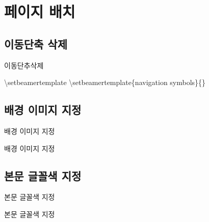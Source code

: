 \documentclass[ aspectratio=169,  10pt,blue,xcolor=pdftex,dvipsnames,table,handout,notes]{beamer}
\begin{document}
		\section{페이지 배치}

		\subsection{이동단축 삭제}
		\begin{frame}{이동단추삭제}

			\begin{block} {\textbackslash setbeamertemplate}
			\textbackslash setbeamertemplate\{navigation symbols\}\{\}
			\end{block}
		\end{frame}


		\subsection{배경 이미지 지정}
		\begin{frame}[shrink=0]{배경 이미지 지정}

			\begin{block} {배경 이미지 지정}
			\end{block}
		\end{frame}


		\subsection{본문 글꼴색 지정}
		\begin{frame}[shrink=0]{본문 글꼴색 지정}

			\begin{block} {본문 글꼴색 지정}
			\end{block}
		\end{frame}
\end{document}
